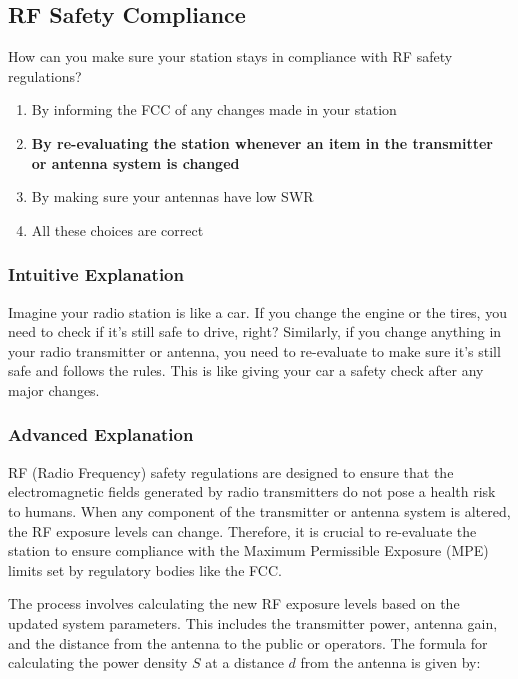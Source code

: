 \subsection{RF Safety Compliance}
\label{T0C09}

\begin{tcolorbox}[colback=gray!10!white,colframe=black!75!black,title=T0C09]
How can you make sure your station stays in compliance with RF safety regulations?
\begin{enumerate}[label=\Alph*)]
    \item By informing the FCC of any changes made in your station
    \item \textbf{By re-evaluating the station whenever an item in the transmitter or antenna system is changed}
    \item By making sure your antennas have low SWR
    \item All these choices are correct
\end{enumerate}
\end{tcolorbox}

\subsubsection{Intuitive Explanation}
Imagine your radio station is like a car. If you change the engine or the tires, you need to check if it’s still safe to drive, right? Similarly, if you change anything in your radio transmitter or antenna, you need to re-evaluate to make sure it’s still safe and follows the rules. This is like giving your car a safety check after any major changes.

\subsubsection{Advanced Explanation}
RF (Radio Frequency) safety regulations are designed to ensure that the electromagnetic fields generated by radio transmitters do not pose a health risk to humans. When any component of the transmitter or antenna system is altered, the RF exposure levels can change. Therefore, it is crucial to re-evaluate the station to ensure compliance with the Maximum Permissible Exposure (MPE) limits set by regulatory bodies like the FCC.

The process involves calculating the new RF exposure levels based on the updated system parameters. This includes the transmitter power, antenna gain, and the distance from the antenna to the public or operators. The formula for calculating the power density \( S \) at a distance \( d \) from the antenna is given by:

